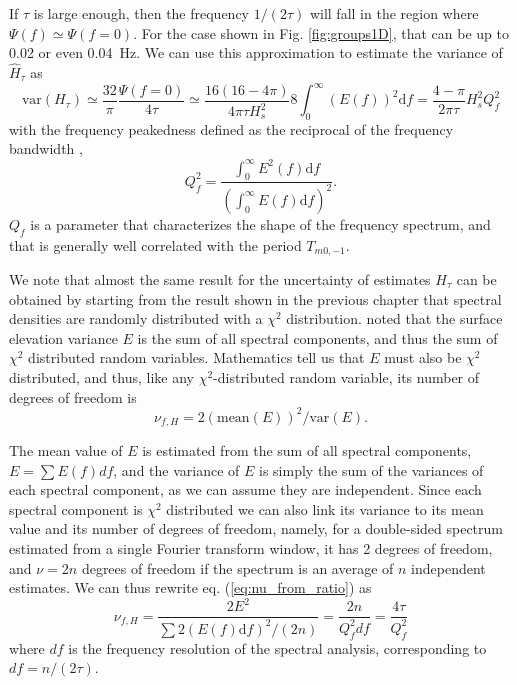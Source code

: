 {If $\tau$ is large enough, then the frequency $1/(2 \tau)$ will fall in the region where $\Psi(f) \simeq \Psi(f=0)$. For the case shown in Fig. \ref{fig:groups1D}, that can be up to 0.02 or even 0.04~Hz. We can use this approximation to estimate the  variance of $\widehat{H}_\tau$ as
\begin{equation}
   \mathrm{var}(H_\tau)\simeq \frac{32}{\pi} \frac{\Psi (f=0)}{4 \tau} \simeq \frac{16(16 - 4 \pi) }{4 \pi \tau H_s^2} 8 \int_0^\infty (E(f))^2 {\mathrm d}f =  \frac{4 -  \pi }{ 2 \pi  \tau }  H_s^2 Q_f^2 
   \label{eq:groups_var_1D}
\end{equation}
with the frequency peakedness defined as the reciprocal of the frequency bandwidth \citep{Saulnier&al.2012}, 
\begin{equation} 
   Q_f^2 = \frac{  \int_{0}^\infty E^2(f)\mathrm{d}f}{\left(\int_{0}^\infty E(f)\mathrm{d}f\right)^2}. \label{eq:Qf}
\end{equation}
$Q_f$ is a parameter that characterizes the shape of the frequency spectrum, and that is generally well correlated with the period $T_{m0,-1}$. 

We note that almost the same result for the uncertainty of estimates $H_\tau$ can be obtained by starting from the result shown in the previous chapter that  
spectral densities are randomly distributed with a $\chi^2$ distribution. \cite{Young1986} noted that the surface elevation variance $E$ is the sum of all spectral components, and thus the sum of $\chi^2$ distributed random variables. Mathematics tell us that $E$ must also be $\chi^2$ distributed, and thus, like any $\chi^2$-distributed random variable, its number of degrees of freedom is 
\begin{equation}
\nu_{f,H}=2 (\mathrm{mean}(E))^2/\mathrm{var}(E).\label{eq:nu_from_ratio}
\end{equation} 

The mean value of $E$ is estimated from the sum of all spectral components, $E= \sum E(f) df$, and the variance of $E$ is simply the sum of the variances of each spectral component, as we can assume they are independent. Since each spectral component is $\chi^2$ distributed we can also link its variance to its mean value and its number of degrees of freedom, namely, for a double-sided spectrum estimated from a single Fourier transform window, it has 2 degrees of freedom, and $\nu=2 n$ degrees of freedom if the spectrum is an average of $n$ independent estimates.  We can thus rewrite eq. (\ref{eq:nu_from_ratio}) as 
\begin{equation}
\nu_{f,H}=\frac{2 E^2}{\sum 2 ( E (f)\mathrm{d}f)^2 / (2n)}=\frac{2n}{ Q_f^2 df}=\frac{4 \tau}{ Q_f^2} \label{eq:nuf}
\end{equation}
 where $df$ is the frequency resolution of the spectral analysis, corresponding to $df=n/(2 \tau)$. 
 
}
